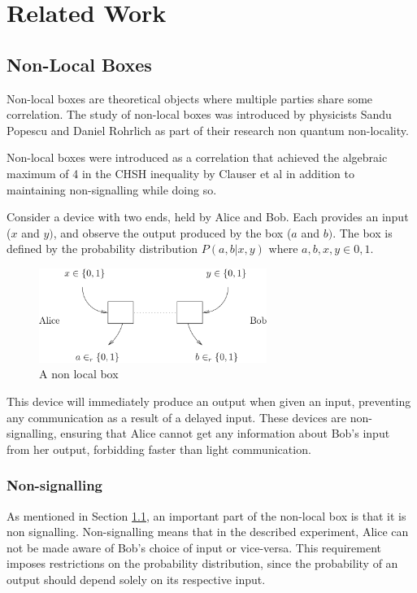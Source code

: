 \documentclass[report.tex]{subfiles}
\begin{document}
\chapter{Related Work} %
\label{cha:related_work}


\section{Non-Local Boxes} %
\label{sec:non_local_boxes}
Non-local boxes are theoretical objects where multiple parties share some
correlation. The study of non-local boxes was introduced by physicists Sandu
Popescu and Daniel Rohrlich as part of their research non quantum non-locality.

Non-local boxes were introduced as a correlation that achieved the algebraic
maximum of 4 in the CHSH inequality by Clauser et al in addition to maintaining
non-signalling while doing so.

Consider a device with two ends, held by Alice and Bob. Each provides an
input (\(x\) and \(y)\), and observe the output produced by the box (\(a\) and
\(b)\). The box is defined by the probability distribution \(P(a,b | x,y)\) 
where \(a, b, x, y \in {0, 1}\). 

\begin{figure}[H]
  \centering
  \includegraphics[width=0.66\textwidth]{img/nlb}
  \caption{A non local box}
\end{figure}

This device will immediately produce an output when given an input, preventing
any communication as a result of a delayed input. These devices are
non-signalling, ensuring that Alice cannot get any information about Bob's input
from her output, forbidding faster than light communication.

\subsection{Non-signalling} %
\label{sub:non_signalling}
As mentioned in Section \ref{sec:non_local_boxes}, an important part of the
non-local box is that it is non signalling. Non-signalling means that in the
described experiment, Alice can not be made aware of Bob's choice of input or
vice-versa. This requirement imposes restrictions on the probability
distribution, since the probability of an output should depend solely on its
respective input. 
\end{document}
